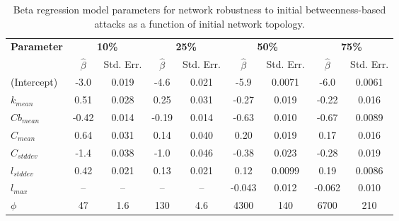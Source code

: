 \begin{table}[!htp]
\scriptsize
\centering

\begin{tabular}{lcccccccc}
\toprule
\multirow{2}{*}{\textbf{Parameter}} & \multicolumn{2}{c}{\textbf{10\%}} & \multicolumn{2}{c}{\textbf{25\%}} & \multicolumn{2}{c}{\textbf{50\%}} & \multicolumn{2}{c}{\textbf{75\%}}\\
 & $\hat{\beta}$ & Std. Err. & $\hat{\beta}$ & Std. Err. & $\hat{\beta}$ & Std. Err. & $\hat{\beta}$ & Std. Err. \\
\midrule

(Intercept) & -3.0 & 0.019 & -4.6 & 0.021 & -5.9 & 0.0071 & -6.0 & 0.0061 \\
$k_{mean}$ & 0.51 & 0.028 & 0.25 & 0.031 & -0.27 & 0.019 & -0.22 & 0.016 \\
$Cb_{mean}$ & -0.42 & 0.014 & -0.19 & 0.014 & -0.63 & 0.010 & -0.67 & 0.0089 \\
$C_{mean}$ & 0.64 & 0.031 & 0.14 & 0.040 & 0.20 & 0.019 & 0.17 & 0.016 \\
$C_{std dev}$ & -1.4 & 0.038 & -1.0 & 0.046 & -0.38 & 0.023 & -0.28 & 0.019 \\
$l_{std dev}$ & 0.42 & 0.021 & 0.13 & 0.021 & 0.12 & 0.0099 & 0.19 & 0.0086 \\
$l_{max}$ & -- & -- & -- & -- & -0.043 & 0.012 & -0.062 & 0.010 \\
$\phi$ & 47 & 1.6 & 130 & 4.6 & 4300 & 140 & 6700 & 210 \\

\bottomrule

\end{tabular}

\caption[Beta regression model parameters for network robustness to initial betweenness-based attacks.]{\label{tab:ch2:betaregNBi}Beta regression model parameters for network robustness to initial betweenness-based attacks as a function of initial network topology.}
\end{table}




